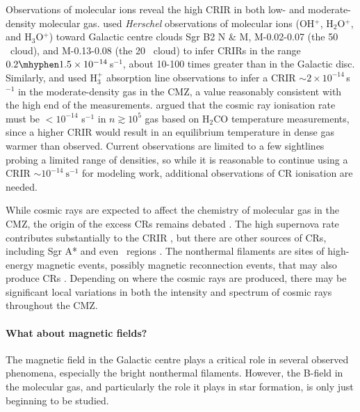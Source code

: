 Observations of molecular ions reveal the high CRIR in both low- and moderate-density molecular gas. \citet{Indriolo2015} used {\it Herschel} observations of molecular ions (OH$^+$, H$_2$O$^+$, and H$_3$O$^+$) toward Galactic centre clouds Sgr B2 N \& M, M-0.02-0.07 (the 50 \kms\ cloud), and M-0.13-0.08 (the 20 \kms\ cloud) to infer CRIRs in the range $0.2\mhyphen1.5\times10^{-14}$\,s$^{-1}$, about 10-100 times greater than in the Galactic disc.  
Similarly, \citet{LePetit2016} and \citet{Oka2019} used H$_3^+$ absorption line observations to infer a CRIR $\sim2\times10^{-14}$\,s$^{-1}$ in the moderate-density gas in the CMZ, a value reasonably consistent with the high end of the \citet{Indriolo2015} measurements.
\citet{Ginsburg2016} argued that the cosmic ray ionisation rate must be $<10^{-14}$ s$^{-1}$ in $n\gtrsim10^5$ \percc gas based on H$_2$CO temperature measurements, since a higher CRIR would result in an equilibrium temperature in dense gas warmer than observed.
Current observations are limited to a few sightlines probing a limited range of densities, so while it is reasonable to continue using a CRIR $\sim10^{-14}~\mathrm{s}^{-1}$ for modeling work, additional observations of CR ionisation are needed.

While cosmic rays are expected to affect the chemistry of molecular gas in the CMZ, the origin of the excess CRs remains debated \citep[see][for a thorough review]{Bykov2020}.
The high supernova rate contributes substantially to the CRIR \citep{Ponti2015}, but there are other sources of CRs, including Sgr A* \citep{HESSCollaboration2016} and even \hii\ regions \citep{Meng2019,Padovani2019}.
The nonthermal filaments are sites of high-energy magnetic events, possibly magnetic reconnection events, that may also produce CRs \citep{Heywood2019, Yusef-Zadeh2019,Guenduez2020,Sofue2020, Thomas2020, Zhang2020, Coughlin2021}.
Depending on where the cosmic rays are produced, there may be significant local variations in both the intensity and spectrum of cosmic rays throughout the CMZ.

\paragraph{What about magnetic fields?}
\label{sec:magneticfields}

The magnetic field in the Galactic centre plays a critical role in several observed phenomena, especially the bright nonthermal filaments.
However, the B-field in the molecular gas, and particularly the role it plays in star formation, is only just beginning to be studied.
  
